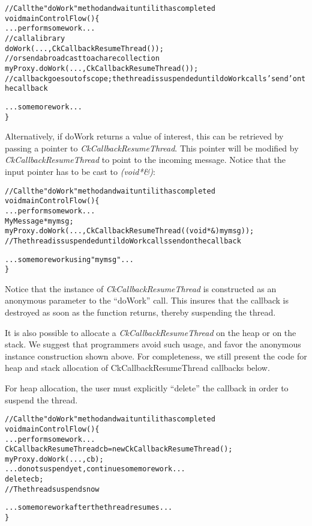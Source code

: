 \begin{alltt}
// Call the "doWork" method and wait until it has completed
void mainControlFlow() \{
  ...perform some work...
  // call a library
  doWork(...,CkCallbackResumeThread());
  // or send a broadcast to a chare collection
  myProxy.doWork(...,CkCallbackResumeThread());
  // callback goes out of scope; the thread is suspended until doWork calls 'send' on the callback
  
  ...some more work...
\}
\end{alltt}

Alternatively, if doWork returns a value of interest, this can be retrieved by
passing a pointer to {\em CkCallbackResumeThread}. This pointer will be modified
by {\em CkCallbackResumeThread} to point to the incoming message. Notice that
the input pointer has to be cast to {\em (void*\&)}:

\begin{alltt}
// Call the "doWork" method and wait until it has completed
void mainControlFlow() \{
  ...perform some work...
  MyMessage *mymsg;
  myProxy.doWork(...,CkCallbackResumeThread((void*\&)mymsg));
  // The thread is suspended until doWork calls send on the callback

  ...some more work using "mymsg"...
\}
\end{alltt}

Notice that the instance of {\em CkCallbackResumeThread} is constructed
as an anonymous parameter to the ``doWork'' call. This insures that the callback
is destroyed as soon as the function returns, thereby suspending the thread.

It is also possible to allocate a {\em CkCallbackResumeThread} on the heap or on
the stack. We suggest that programmers avoid such usage, and favor the anonymous instance construction
shown above. For completeness, we still present the code for heap and stack
allocation of CkCallbackResumeThread callbacks below.

For heap allocation, the user must explicitly ``delete'' the callback in order to
suspend the thread.

\begin{alltt}
// Call the "doWork" method and wait until it has completed
void mainControlFlow() \{
  ...perform some work...
  CkCallbackResumeThread cb = new CkCallbackResumeThread();
  myProxy.doWork(...,cb);
  ...do not suspend yet, continue some more work...
  delete cb;
  // The thread suspends now

  ...some more work after the thread resumes...
\}
\end{alltt}


